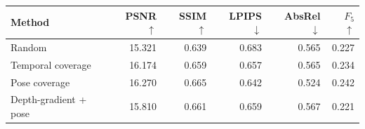 \begin{tabular}{lrrrrr}
\toprule
Method & PSNR $\uparrow$ & SSIM $\uparrow$ & LPIPS $\downarrow$ & AbsRel $\downarrow$ & $F_{5}$ $\uparrow$ \\
\midrule
Random & 15.321 & 0.639 & 0.683 & 0.565 & 0.227 \\
Temporal coverage & 16.174 & 0.659 & 0.657 & 0.565 & 0.234 \\
Pose coverage & 16.270 & 0.665 & 0.642 & 0.524 & 0.242 \\
Depth-gradient + pose & 15.810 & 0.661 & 0.659 & 0.567 & 0.221 \\
\bottomrule
\end{tabular}
